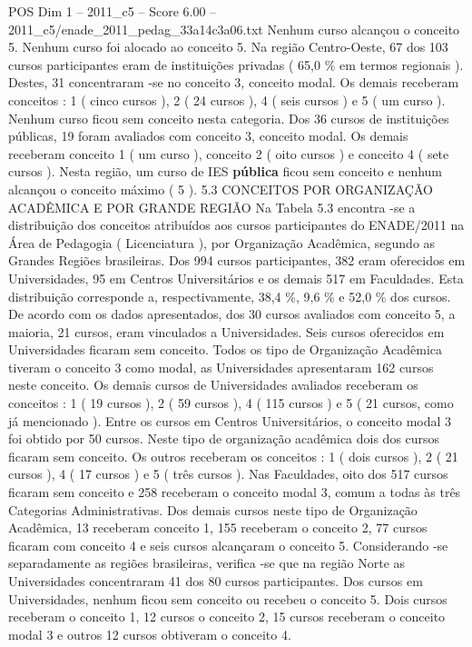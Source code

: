 \begin{textsample}{POS Dim 1 – 2011\_c5 – Score 6.00 – 2011\_c5/enade\_2011\_pedag\_33a14c3a06.txt}
Nenhum curso alcançou o conceito 5.
Nenhum curso foi alocado ao conceito 5.
Na região Centro-Oeste, 67 dos 103 cursos participantes eram de instituições privadas ( 65,0 \% em termos regionais ).
Destes, 31 concentraram -se no conceito 3, conceito modal.
Os demais receberam conceitos : 1 ( cinco cursos ), 2 ( 24 cursos ), 4 ( seis cursos ) e 5 ( um curso ).
Nenhum curso ficou sem conceito nesta categoria.
Dos 36 cursos de instituições públicas, 19 foram avaliados com conceito 3, conceito modal.
Os demais receberam conceito 1 ( um curso ), conceito 2 ( oito cursos ) e conceito 4 ( sete cursos ).
Nesta região, um curso de IES \textbf{pública} ficou sem conceito e nenhum alcançou o conceito máximo ( 5 ). 5.3 CONCEITOS POR ORGANIZAÇÃO ACADÊMICA E POR GRANDE REGIÃO Na Tabela 5.3 encontra -se a distribuição dos conceitos atribuídos aos cursos participantes do ENADE/2011 na Área de Pedagogia ( Licenciatura ), por Organização Acadêmica, segundo as Grandes Regiões brasileiras.
Dos 994 cursos participantes, 382 eram oferecidos em Universidades, 95 em Centros Universitários e os demais 517 em Faculdades.
Esta distribuição corresponde a, respectivamente, 38,4 \%, 9,6 \% e 52,0 \% dos cursos.
De acordo com os dados apresentados, dos 30 cursos avaliados com conceito 5, a maioria, 21 cursos, eram vinculados a Universidades.
Seis cursos oferecidos em Universidades ficaram sem conceito.
Todos os tipo de Organização Acadêmica tiveram o conceito 3 como modal, as Universidades apresentaram 162 cursos neste conceito.
Os demais cursos de Universidades avaliados receberam os conceitos : 1 ( 19 cursos ), 2 ( 59 cursos ), 4 ( 115 cursos ) e 5 ( 21 cursos, como já mencionado ).
Entre os cursos em Centros Universitários, o conceito modal 3 foi obtido por 50 cursos.
Neste tipo de organização acadêmica dois dos cursos ficaram sem conceito.
Os outros receberam os conceitos : 1 ( dois cursos ), 2 ( 21 cursos ), 4 ( 17 cursos ) e 5 ( três cursos ).
Nas Faculdades, oito dos 517 cursos ficaram sem conceito e 258 receberam o conceito modal 3, comum a todas às três Categorias Administrativas.
Dos demais cursos neste tipo de Organização Acadêmica, 13 receberam conceito 1, 155 receberam o conceito 2, 77 cursos ficaram com conceito 4 e seis cursos alcançaram o conceito 5.
Considerando -se separadamente as regiões brasileiras, verifica -se que na região Norte as Universidades concentraram 41 dos 80 cursos participantes.
Dos cursos em Universidades, nenhum ficou sem conceito ou recebeu o conceito 5.
Dois cursos receberam o conceito 1, 12 cursos o conceito 2, 15 cursos receberam o conceito modal 3 e outros 12 cursos obtiveram o conceito 4.

\end{textsample}
